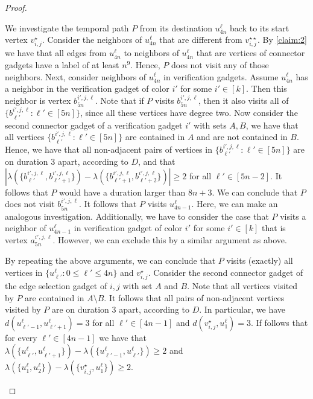 \documentclass[a4paper,UKenglish,cleveref, autoref, thm-restate, anonymous]{lipics-v2021}
\begin{document}
\begin{proof}
\begin{claimproof}
    We investigate the temporal path $P$ from its destination $u^\ell_{4n}$ back to its start vertex $v_{i,j}^\star$. Consider the neighbors of $u^\ell_{4n}$ that are different from $v_{i,j}^{\star\star}$. By \cref{claim:2} we have that all edges from $u^\ell_{4n}$ to neighbors of $u^\ell_{4n}$ that are vertices of connector gadgets have a label of at least $n^9$. Hence, $P$ does not visit any of those neighbors. Next, consider neighbors of $u^\ell_{4n}$ in verification gadgets. Assume $u^\ell_{4n}$ has a neighbor in the verification gadget of color $i'$ for some $i'\in[k]$. Then this neighbor is vertex $b^{i',j,\ell}_{5n}$. Note that if $P$ visits $b^{i',j,\ell}_{5n}$, then it also visits all of $\{b^{i',j,\ell}_{\ell'} :  \ell'\in[5n]\}$, since all these vertices have degree two. 
   Now consider the second connector gadget of a verification gadget $i'$ with sets $A,B$, we have that all vertices $\{b^{i',j,\ell}_{\ell'} :  \ell'\in[5n]\}$ are contained in $A$ and are not contained in $B$. Hence, we have that all non-adjacent pairs of vertices in $\{b^{i',j,\ell}_{\ell'} :  \ell'\in[5n]\}$ are on duration $3$ apart, according to $D$, and that $|\lambda(\{b^{i',j,\ell}_{\ell'},b^{i',j,\ell}_{\ell'+1}\})-\lambda(\{b^{i',j,\ell}_{\ell'+1},b^{i',j,\ell}_{\ell'+2}\})|\ge 2$ for all $\ell'\in[5n-2]$.  
    It follows that $P$ would have a duration larger than $8n+3$. We can conclude that $P$ does not visit $b^{i',j,\ell}_{5n}$. It follows that $P$ visits $u^\ell_{4n-1}$.
    Here, we can make an analogous investigation. Additionally, we have to consider the case that $P$ visits a neighbor of $u^\ell_{4n-1}$ in verification gadget of color $i'$ for some $i'\in[k]$ that is vertex $a^{i',j,\ell}_{5n}$. However, we can exclude this by a similar argument as above. 

    By repeating the above arguments, we can conclude that $P$ visits (exactly) all vertices in $\{u^\ell_{\ell'} :  0\le \ell'\le 4n\}$ and $v_{i,j}^\star$.
    Consider the second connector gadget of the edge selection gadget of $i,j$ with set $A$ and $B$. Note that all vertices visited by $P$ are contained in $A\setminus B$. It follows that all pairs of non-adjacent vertices visited by $P$ are on duration $3$ apart, according to $D$. In particular, we have $d(u^\ell_{\ell'-1},u^\ell_{\ell'+1})=3$ for all $\ell'\in[4n-1]$ and $d(v_{i,j}^\star,u^\ell_{1})=3$. If follows that for every $\ell'\in[4n-1]$ we have that $\lambda(\{u^\ell_{\ell'},u^\ell_{\ell'+1}\})-\lambda(\{u^\ell_{\ell'-1},u^\ell_{\ell'}\})\ge 2$ and $\lambda(\{u^\ell_{1},u^\ell_{2}\})-\lambda(\{v_{i,j}^\star,u^\ell_{1}\})\ge 2$. 


\end{claimproof}
\end{proof}
\end{document}
